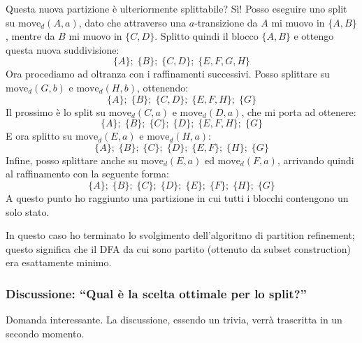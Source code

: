 \documentclass[class=book, crop=false, oneside, 12pt]{standalone}
\begin{document}
Questa nuova partizione è ulteriormente splittabile? Sì! Posso eseguire uno split su \(\textrm{move}_d(A, a)\), dato che attraverso una \(a\)-transizione da \(A\) mi muovo in \(\{A,B\}\), mentre da \(B\) mi muovo in \(\{C,D\}\). Splitto quindi il blocco \(\{A,B\}\) e ottengo questa nuova suddivisione:
\begin{equation*}
    \{A\};\; \{B\};\; \{C, D\};\; \{E,F,G,H\}
\end{equation*}
Ora procediamo ad oltranza con i raffinamenti successivi. Posso splittare su \(\textrm{move}_d(G,b)\) e \(\textrm{move}_d(H,b)\), ottenendo:
\begin{equation*}
    \{A\};\; \{B\};\; \{C, D\};\; \{E,F,H\};\; \{G\}
\end{equation*}
Il prossimo è lo split su \(\textrm{move}_d(C, a)\) e \(\textrm{move}_d(D, a)\), che mi porta ad ottenere:
\begin{equation*}
    \{A\};\; \{B\};\; \{C\};\; \{D\};\; \{E,F,H\};\; \{G\}
\end{equation*}
E ora splitto su \(\textrm{move}_d(E, a)\) e \(\textrm{move}_d(H, a)\):
\begin{equation*}
    \{A\};\; \{B\};\; \{C\};\; \{D\};\; \{E,F\};\; \{H\};\; \{G\}
\end{equation*}
Infine, posso splittare anche su \(\textrm{move}_d(E, a)\) ed \(\textrm{move}_d(F, a)\), arrivando quindi al raffinamento con la seguente forma:
\begin{equation*}
    \{A\};\; \{B\};\; \{C\};\; \{D\};\; \{E\};\; \{F\};\; \{H\};\; \{G\}
\end{equation*}
A questo punto ho raggiunto una partizione in cui tutti i blocchi contengono un solo stato.

In questo caso ho terminato lo svolgimento dell'algoritmo di partition refinement; questo significa che il DFA da cui sono partito (ottenuto da subset construction) era esattamente minimo.

\subsubsection[Tutta da risistemare]{Discussione: “Qual è la scelta ottimale per lo split?”}
Domanda interessante. La discussione, essendo un trivia, verrà trascritta in un secondo momento.
\end{document}
